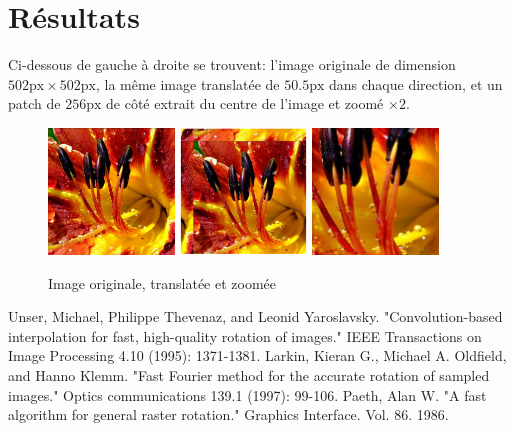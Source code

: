 \documentclass[12pt]{article}
\begin{document}
\section*{Résultats}
Ci-dessous de gauche à droite se trouvent: l'image originale de dimension $502\text{px} \times 502 \text{px}$, la même image translatée de $50.5 \text{px}$ dans chaque direction, et un patch de $256\text{px}$ de côté extrait du centre de l'image et zoomé $\times 2$.

\begin{figure}[h]
	\includegraphics[width=0.3\textwidth]{flowers.png}
	\includegraphics[width=0.3\textwidth]{flowers-translated.png}
	\includegraphics[width=0.3\textwidth]{flowers-zoomed.png}
  \caption{Image originale, translatée et zoomée}
\end{figure}
\begin{thebibliography}{2}

  Unser, Michael, Philippe Thevenaz, and Leonid Yaroslavsky. 
  "Convolution-based interpolation for fast, high-quality rotation of images." 
  IEEE Transactions on Image Processing 4.10 (1995): 1371-1381.
  Larkin, Kieran G., Michael A. Oldfield, and Hanno Klemm. 
  "Fast Fourier method for the accurate rotation of sampled images." 
  Optics communications 139.1 (1997): 99-106.
	Paeth, Alan W. 
	"A fast algorithm for general raster rotation." 
	Graphics Interface. Vol. 86. 1986.

\end{thebibliography}
\end{document}
